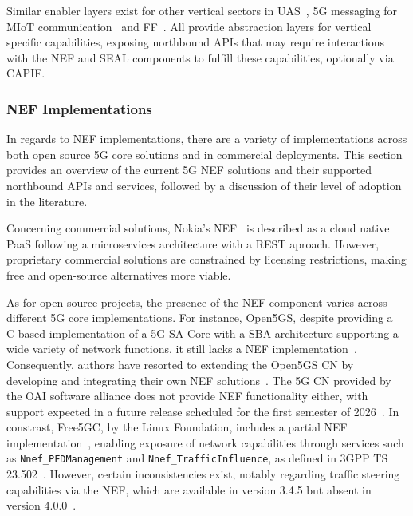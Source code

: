 Similar enabler layers exist for other vertical sectors in \acf{UAS}~\cite{ETSI_TS_123_255_V18_2_0_UAS}, \acs{5G} messaging for \acf{MIoT} communication~\cite{ETSI_TS_123_554_V18_10_0_Messaging} and \acf{FF}~\cite{3GPP_23_745_V17_0_0_FF}. All provide abstraction layers for vertical specific capabilities, exposing northbound \acsp{API} that may require interactions with the \acs{NEF} and \acs{SEAL} components to fulfill these capabilities, optionally via \acs{CAPIF}.



\subsubsection{NEF Implementations} \label{exposure:NEFimplementations}

In regards to \ac{NEF} implementations, there are a variety of implementations across both open source \acs{5G} core solutions and in commercial deployments. This section provides an overview of the current \ac{5G} \ac{NEF} solutions and their supported northbound \acsp{API} and services, followed by a discussion of their level of adoption in the literature. 

Concerning commercial solutions, Nokia's \ac{NEF}~\cite{NokiaNEF2022} is described as a cloud native \ac{PaaS} following a microservices architecture with a \ac{REST} aproach. However, proprietary commercial solutions are constrained by licensing restrictions, making free and open-source alternatives more viable.

As for open source projects, the presence of the \ac{NEF} component varies across different \ac{5G} core implementations. For instance, Open5GS, despite providing a C-based implementation of a \ac{5G SA} Core with a \ac{SBA} architecture supporting a wide variety of network functions, it still lacks a \ac{NEF} implementation~\cite{Open5GSDocs}. Consequently, authors have resorted to extending the Open5GS \acs{CN} by developing and integrating their own \ac{NEF} solutions~\citep{CloudEnabledDeployment5GN, DynamicQoSAdaptationviaExposedServiceAPIs}. The \ac{5G} \ac{CN} provided by the \ac{OAI} software alliance does not provide \ac{NEF} functionality either, with support expected in a future release scheduled for the first semester of 2026~\cite{OpenAirInterface5GCN}. In constrast, Free5GC, by the Linux Foundation, includes a partial \ac{NEF} implementation~\cite{Free5GC-NEF}, enabling exposure of network capabilities through services such as \texttt{Nnef\_PFDManagement} and \texttt{Nnef\_TrafficInfluence}, as defined in 3GPP TS 23.502~\cite{3GPP-23.502}. However, certain inconsistencies exist, notably regarding traffic steering capabilities via the \ac{NEF}, which are available in version 3.4.5 but absent in version 4.0.0~\cite{Free5GCv4.0.0NotSupportTrafficSteering}.


